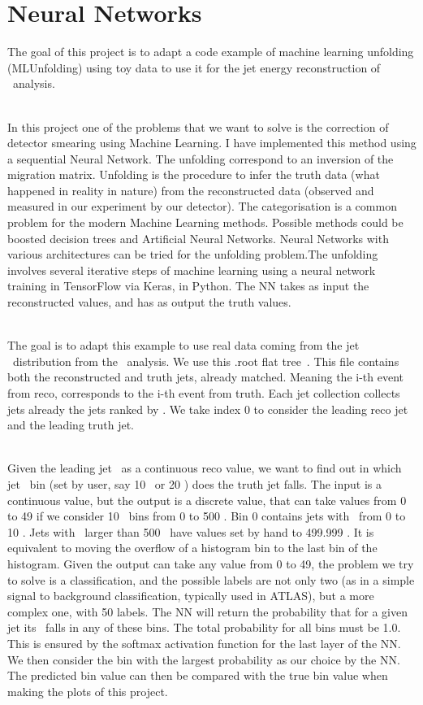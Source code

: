 \section{Neural Networks}
\label{sec:NeuralNetworks}

The goal of this project is to adapt a code example of machine learning unfolding (MLUnfolding) using toy data to use it for the jet energy reconstruction of \ttbaremu~analysis.

\ \\In this project one of the problems that we want to solve is the correction of detector smearing using Machine Learning. I have implemented this method using a sequential Neural Network. The unfolding correspond to an inversion of the migration matrix. Unfolding is the procedure to infer the truth data (what happened in reality in nature) from the reconstructed data (observed and measured in our experiment by our detector). The categorisation is a common problem for the modern Machine Learning methods. Possible methods could be boosted decision trees and Artificial Neural Networks. Neural Networks with various architectures can be tried for the unfolding problem.The unfolding involves several iterative steps of machine learning using a neural network training in TensorFlow via Keras, in Python. The NN takes as input the reconstructed values, and has as output the truth values.

\ \\The goal is to adapt this example to use real data coming from the jet \pt~distribution from the \ttbaremu~analysis. We use this .root flat tree~\cite{RootFile}.
This file contains both the reconstructed and truth jets, already matched. Meaning the i-th event from reco, corresponds to the i-th event from truth. Each jet collection collects jets already the jets ranked by \pt. We take index 0 to consider the leading reco jet and the leading truth jet.

\ \\Given the leading jet \pt~as a continuous reco value, we want to find out in which jet \pt~bin (set by user, say 10 \GeV~or 20 \GeV) does the truth jet falls. The input is a continuous value, but the output is a discrete value, that can take values from 0 to 49 if we consider 10 \GeV~bins from 0 to 500 \GeV. Bin 0 contains jets with \pt~from 0 to 10 \GeV. Jets with \pt~larger than 500 \GeV~have values set by hand to 499.999 \GeV. It is equivalent to moving the overflow of a histogram bin to the last bin of the histogram. Given the output can take any value from 0 to 49, the problem we try to solve is a classification, and the possible labels are not only two (as in a simple signal to background classification, typically used in ATLAS), but a more complex one, with 50 labels. The NN will return the probability that for a given jet its \pt~falls in any of these bins. The total probability for all bins must be 1.0. This is ensured by the softmax activation function for the last layer of the NN. We then consider the bin with the largest probability as our choice by the NN. The predicted bin value can then be compared with the true bin value when making the plots of this project.

